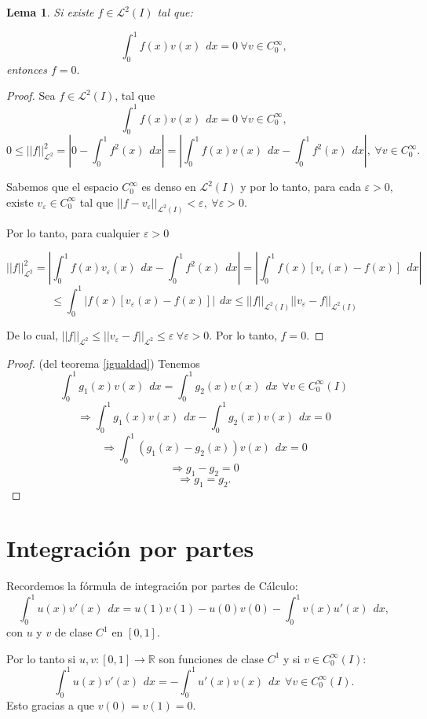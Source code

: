 \documentclass[12pt,spanish,oneside]{book}
\theoremstyle{plain}
\newtheorem{lema}[teo]{Lema}
\numberwithin{equation}{chapter}
\theoremstyle{definition}
\theoremstyle{remark}
\newcommand{\re}{\mathbb{R}}
\newcommand{\LD}{\mathcal{L}^2}
\newcommand{\cz}{C_{\scriptscriptstyle{0}}^{\scriptscriptstyle{\infty}}}
\newcommand{\icu}{\int_0^1}
\newcommand{\dx}{\hspace{5pt} dx}
\begin{document}
\begin{lema}
Si existe $f\in\LD(I)$ tal que:

$$\icu f(x)v(x)\dx=0\hspace{3pt}\forall v\in  C_0^\infty,$$ entonces $f=0.$
\end{lema}
\begin{proof}
Sea $f\in\LD(I)$, tal que \[\icu f(x)v(x)\dx=0\hspace{3pt}\forall v\in  C_0^\infty, \]
$$0\leq ||f||_{\LD}^2=\left|0-\icu f^2(x)\dx\right|=\left|\icu f(x) v(x)\dx-\icu f^2(x)\dx\right|, \hspace{3pt} \forall	v\in  C_0^\infty.$$

Sabemos que el espacio $ C_0^\infty$ es denso en $\LD(I)$ y por lo tanto, para cada $\varepsilon>0$, existe $v_\varepsilon\in  C_0^\infty $ tal que $||f-v_\varepsilon||_{\LD(I)}<\varepsilon,\hspace{3pt} \forall \varepsilon >0.$

Por lo tanto, para cualquier $\varepsilon>0$

$$||f||_{\LD}^2= \left|\icu f(x) v_\varepsilon(x)\dx-\icu f^2(x)\dx\right|=\left|\icu f(x) \left[v_\varepsilon(x)- f(x)\right]\dx\right| $$
$$\leq \icu\left| f(x) \left[v_\varepsilon(x)- f(x)\right]\right|\dx\leq ||f||_{\LD(I)} ||v_\varepsilon -f||_{\LD(I)}$$ 

De lo cual, $||f||_{\LD}\leq ||v_\varepsilon-f||_{\LD}\leq \varepsilon\hspace{3pt}\forall\varepsilon >0$. Por lo tanto, $f=0$.
\end{proof}
\begin{proof}{(del teorema \ref{igualdad})}
Tenemos
\[\icu g_1(x)v(x)\dx=\icu g_2(x)v(x) \dx \hspace{5pt} \forall v \in \cz(I) \]
\[\Rightarrow\icu g_1(x)v(x)\dx-\icu g_2(x)v(x)\dx=0\]
\[\Rightarrow\icu (g_1(x)- g_2(x))v(x)\dx=0\]
\[\Rightarrow g_1-g_2=0\]
\[\Rightarrow g_1=g_2.\]
\end{proof}

\section{Integración por partes}
Recordemos la fórmula de integración por partes de Cálculo:
\[\int_0^1 u(x) v'(x) \hspace{5pt} dx = u(1)v(1)- u(0)v(0) -\int_0^1 v(x)u'(x) \hspace{5pt} dx, \]
con $u$ y $v$ de clase $ C^1$ en $[0,1]$.

Por lo tanto si $u,v:[0,1]\rightarrow \re$ son funciones de clase $ C^1$ y si $v\in\cz(I)$:
\[\icu u(x) v'(x) \dx =-\icu u'(x) v(x) \dx \hspace{5pt} \forall v \in \cz(I). \]
Esto gracias a que $v(0)=v(1)=0$.
\end{document}
